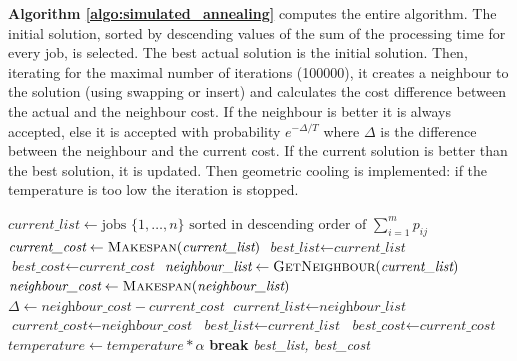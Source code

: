 \textbf{Algorithm \ref{algo:simulated_annealing}} computes the entire algorithm. The initial solution, sorted by descending values of the sum of the processing time for every job, is selected. The best actual solution is the initial solution. Then, iterating for the maximal number of iterations (100000), it creates a neighbour to the solution (using swapping or insert) and calculates the cost difference between the actual and the neighbour cost. If the neighbour is better it is always accepted, else it is accepted with probability $e^{-\Delta/T}$ where $\Delta$ is the difference between the neighbour and the current cost. If the current solution is better than the best solution, it is updated. Then geometric cooling is implemented: if the temperature is too low the iteration is stopped.
\newpage
\begin{algorithm}[H]
\caption{Simulated annealing}
\label{algo:simulated_annealing}
\begin{algorithmic}[1]

    \Statex
        \Statex
        \State $\textit{current\_list} \gets \text{jobs } \{1, \dots, n\} \text{ sorted in descending order of } \sum_{i=1}^{m} p_{ij}$
        \State $\textit{current\_cost} \gets\text{\textsc{Makespan}}(\textit{current\_list})$
        \Statex
        \State $\textit{best\_list} \gets \textit{current\_list}$
        \State $\textit{best\_cost} \gets \textit{current\_cost}$
        \Statex
            \Statex
            \State $\textit{neighbour\_list} \gets {\textsc{GetNeighbour}}(\textit{current\_list})$
            \State $\textit{neighbour\_cost} \gets {\textsc{Makespan}}(\textit{neighbour\_list})$
            \State $\Delta \gets \textit{neighbour\_cost} - \textit{current\_cost}$
            \Statex
                \State $\textit{current\_list} \gets \textit{neighbour\_list}$
                \State $\textit{current\_cost} \gets \textit{neighbour\_cost}$
            \EndIf
            \Statex
                \State $\textit{best\_list} \gets \textit{current\_list}$
                \State $\textit{best\_cost} \gets \textit{current\_cost}$
            \EndIf
            \Statex    
            \State $\textit{temperature} \gets \textit{temperature} * \alpha$
                \State \textbf{break}
            \EndIf
        \EndFor
        \Statex
        \State \Return \textit{best\_list, best\_cost}
    \EndFunction

\end{algorithmic}
\end{algorithm}

